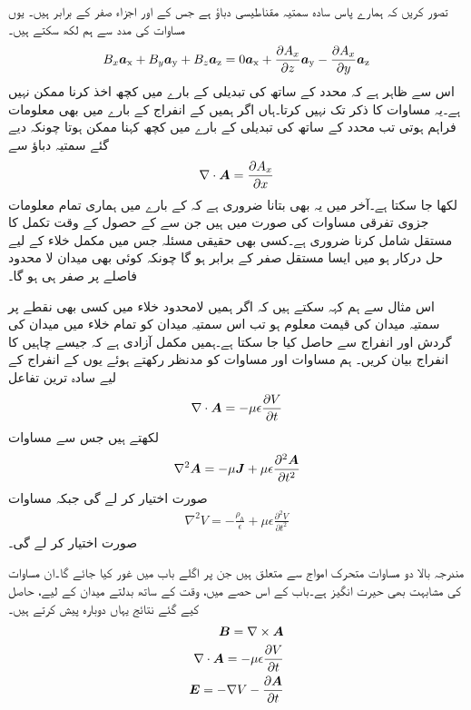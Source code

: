 تصور کریں کہ ہمارے پاس سادہ سمتیہ مقناطیسی دباؤ ہے جس کے  اور  اجزاء صفر کے برابر ہیں۔ یوں مساوات  کی مدد سے ہم لکھ سکتے ہیں۔
\begin{align*}
B_x {\boldsymbol{a}}_{\textup{x}}+B_y {\boldsymbol{a}}_{\textup{y}}+B_z {\boldsymbol{a}}_{\textup{z}}=0{\boldsymbol{a}}_{\textup{x}}+\frac{\partial A_x}{\partial z}{\boldsymbol{a}}_{\textup{y}}-\frac{\partial A_x}{\partial y}{\boldsymbol{a}}_{\textup{z}}
\end{align*}
اس سے ظاہر ہے کہ  محدد کے ساتھ  کی تبدیلی کے بارے میں کچھ اخذ کرنا ممکن نہیں ہے۔یہ مساوات  کا ذکر تک نہیں کرتا۔ہاں اگر ہمیں  کے انفراج کے بارے میں بھی معلومات فراہم ہوتی تب  محدد کے ساتھ  کی تبدیلی کے بارے میں کچھ کہنا ممکن ہوتا چونکہ دیے گئے سمتیہ دباؤ سے
\begin{align*}
\nabla \cdot {\ensuremath{{\boldsymbol{A}}}}=\frac{\partial A_x}{\partial x}
\end{align*} 
لکھا جا سکتا ہے۔آخر میں یہ بھی بتانا ضروری ہے کہ  کے بارے میں ہماری تمام معلومات جزوی تفرقی مساوات کی صورت میں ہیں  جن سے  کے حصول کے وقت تکمل کا مستقل شامل کرنا ضروری ہے۔کسی بھی حقیقی مسئلہ جس میں مکمل خلاء کے لیے حل درکار ہو میں ایسا مستقل صفر کے برابر ہو گا چونکہ کوئی بھی میدان لا محدود فاصلے  پر صفر ہی ہو گا۔

اس مثال سے ہم کہہ سکتے ہیں کہ اگر ہمیں لامحدود خلاء میں کسی بھی نقطے پر سمتیہ میدان کی قیمت معلوم ہو تب اس سمتیہ میدان کو تمام خلاء میں میدان  کی گردش اور انفراج سے حاصل کیا جا سکتا ہے۔ہمیں مکمل آزادی ہے کہ جیسے چاہیں  کا انفراج بیان کریں۔ ہم مساوات  اور مساوات  کو مدنظر رکھتے ہوئے یوں  کے انفراج کے لیے سادہ ترین تفاعل
\begin{align}
\nabla \cdot {\ensuremath{{\boldsymbol{A}}}}=-\mu \epsilon \frac{\partial V}{\partial t}
\end{align}
 لکھتے ہیں جس سے مساوات 
\begin{align}
\nabla^2 {{\boldsymbol{A}}}=-\mu {\ensuremath{{\boldsymbol{J}}}}+\mu \epsilon \frac{\partial^2 {{\boldsymbol{A}}}}{\partial t^2}
\end{align}
صورت اختیار کر لے گی جبکہ مساوات 
\begin{align}
\nabla^2 V=-\frac{\rho_h}{\epsilon}+\mu \epsilon \frac{\partial^2 V}{\partial t^2}
\end{align}
صورت اختیار  کر لے گی۔

مندرجہ بالا دو مساوات متحرک امواج سے متعلق ہیں جن پر اگلے باب میں غور کیا جائے گا۔ان مساوات کی مشابہت بھی حیرت انگیز ہے۔باب کے اس حصے میں، وقت کے ساتھ بدلتے میدان کے لیے، حاصل کیے گئے نتائج یہاں دوبارہ پیش کرتے ہیں۔
\begin{align}
{\ensuremath{{\boldsymbol{B}}}}=\nabla \times {\ensuremath{{\boldsymbol{A}}}}   \label{مساوات_میکس_ویل_تاخیری_مقناطیسی_میدان}\\
\nabla \cdot {\ensuremath{{\boldsymbol{A}}}}=-\mu \epsilon \frac{\partial V}{\partial t}\\
{{\boldsymbol{E}}}=-\nabla V-\frac{\partial {\ensuremath{{\boldsymbol{A}}}}}{\partial t}  \label{مساوات_میکس_ویل_تاخیری_برقی_میدان}
\end{align} 


